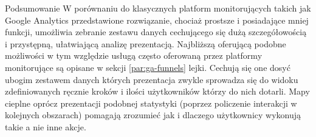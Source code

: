 \begin{chapter}{Podsumowanie}
	W porównaniu do klasycznych platform monitorujących takich jak Google Analytics przedstawione rozwiązanie, chociaż prostsze i posiadające mniej funkcji, umożliwia zebranie zestawu danych cechującego się dużą szczegółowością i przystępną, ułatwiającą analizę prezentacją. Najbliższą oferującą podobne możliwości w tym względzie usługą często oferowaną przez platformy monitorujące są opisane w sekcji \ref{par:ga-funnels} lejki. Cechują się one dosyć  ubogim zestawem danych których prezentacja zwykle sprowadza się do widoku zdefiniowanych ręcznie kroków i ilości użytkowników którzy do nich dotarli. Mapy cieplne oprócz prezentacji podobnej statystyki (poprzez policzenie interakcji w kolejnych obszarach) pomagają zrozumieć jak i dlaczego użytkownicy wykonują takie a nie inne akcje.
	
\end{chapter}

